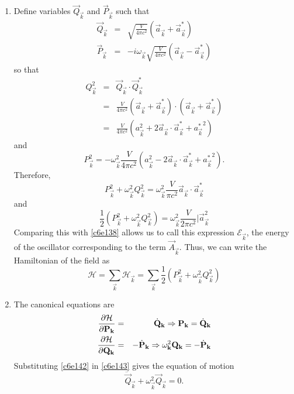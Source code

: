 \begin{enumerate}
\item Define variables $\vec{Q}_\vec{k}$ and $\vec{P}_\vec{k}$ such that
\begin{eqnarray}
\vec{Q}_\vec{k} &=& \sqrt{\frac{V}{4\pi c^2}}(\vec{a}_\vec{k} + \vec{a}_\vec{k}^\ast) \label{c6e139} \\
\vec{P}_\vec{k} &=& -i\omega_\vec{k}\sqrt{\frac{V}{4\pi c^2}}(\vec{a}_\vec{k} - \vec{a}_\vec{k}^\ast) \label{c6e140}
\end{eqnarray}
so that
\begin{eqnarray*}
Q_\vec{k}^2 &=& \vec{Q}_\vec{k} \cdot \vec{Q}_\vec{k}^\ast \\
 &=& \frac{V}{4\pi c^2}(\vec{a}_\vec{k} + \vec{a}_\vec{k}^\ast)\cdot(\vec{a}_\vec{k} + \vec{a}_\vec{k}^\ast) \\
 &=& \frac{V}{4\pi c^2}(a_\vec{k}^2 + 2\vec{a}_\vec{k}\cdot\vec{a}_\vec{k}^\ast + {a_\vec{k}^\ast}^2)
\end{eqnarray*}
and
\[
P_\vec{k}^2 = -\omega_\vec{k}^2\frac{V}{4\pi c^2}(a_\vec{k}^2 - 2\vec{a}_\vec{k}\cdot\vec{a}_\vec{k}^\ast + {a_\vec{k}^\ast}^2).
\]
Therefore,
\[
P_\vec{k}^2 + \omega_\vec{k}^2Q_\vec{k}^2 = \omega_\vec{k}^2\frac{V}{\pi c^2}\vec{a}_\vec{k}\cdot\vec{a}_\vec{k}^\ast
\]
and
\[
\frac{1}{2}(P_\vec{k}^2 + \omega_\vec{k}^2Q_\vec{k}^2) = \omega_\vec{k}^2\frac{V}{2\pi c^2}|\vec{a}_\vec{k}^2
\]
Comparing this with \eqref{c6e138} allows us to call this expression $\mathcal{E}_\vec{k}$,
the energy of the oscillator corresponding to the term $\vec{A}_\vec{k}$. Thus,
we can write the Hamiltonian of the field as
\begin{equation}\label{c6e141}
\mathcal{H} = \sum_\vec{k}\mathcal{H}_\vec{k} = 
\sum_\vec{k}\frac{1}{2}(P_\vec{k}^2 + \omega_\vec{k}^2Q_\vec{k}^2)
\end{equation}

\item The canonical equations are
\begin{eqnarray}
\frac{\partial{\mathcal{H}}}{\partial{\mathbf{P}_\mathbf{k}}} &=& \dot{\mathbf{Q}}_\mathbf{k} \Rightarrow 
 \mathbf{P}_\mathbf{k} = \dot{\mathbf{Q}}_\mathbf{k} \label{c6e142} \\
\frac{\partial{\mathcal{H}}}{\partial{\mathbf{Q}_\mathbf{k}}} &=& -\dot{\mathbf{P}}_\mathbf{k} \Rightarrow
 \omega_\mathbf{k}^2\mathbf{Q}_\mathbf{k} = -\dot{\mathbf{P}}_\mathbf{k} \label{c6e143}
\end{eqnarray}
Substituting \eqref{c6e142} in \eqref{c6e143} gives the equation of motion
\begin{equation}\label{c6e144}
\ddot{\vec{Q}}_\vec{k} + \omega_\vec{k}^2\vec{Q}_\vec{k} = 0.
\end{equation}


\end{enumerate}
